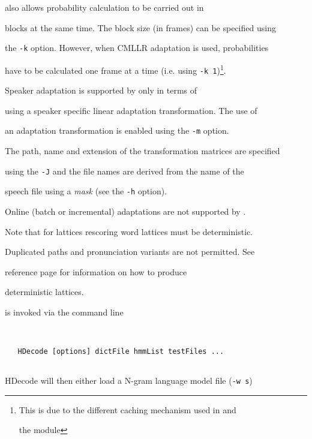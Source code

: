 also allows probability calculation to be carried out in


blocks at the same time. The block size (in frames) can be specified using


the \texttt{-k} option. However, when CMLLR adaptation is used, probabilities


have to be calculated one frame at a time (i.e. using \texttt{-k 1})\footnote{


This is due to the different caching mechanism used in  and 


the  module}.


Speaker adaptation is supported by  only in terms of


using a speaker specific linear adaptation transformation. The use of


an adaptation transformation is enabled using the \texttt{-m} option.


The path, name and extension of the transformation matrices are specified


using the \texttt{-J} and the file names are derived from the name of the


speech file using a \emph{mask} (see the \texttt{-h} option).


Online (batch or incremental) adaptations are not supported by .





Note that for lattices rescoring word lattices must be deterministic.


Duplicated paths and pronunciation variants are not permitted.  See


 reference page for information on how to produce


deterministic lattices.













 is invoked via the command line


\begin{verbatim}


   HDecode [options] dictFile hmmList testFiles ...


\end{verbatim}


HDecode will then either load a N-gram language model file (\texttt{-w s}) 


